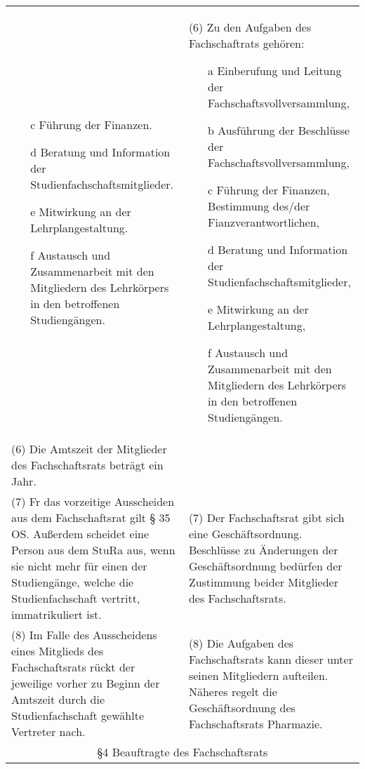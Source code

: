 {\begin{longtable}{|p{7.5cm}|p{7.5cm}|}
\begin{enumerate}
            \item[c] Führung der Finanzen.
            \item[d] Beratung und Information der Studienfachschaftsmitglieder.
            \item[e] Mitwirkung an der Lehrplangestaltung.
            \item[f] Austausch und Zusammenarbeit mit den Mitgliedern des Lehrkörpers in den betroffenen Studiengängen.
        \end{enumerate}&
        (6) Zu den Aufgaben des Fachschaftrats gehören:
        \begin{enumerate}
            \item[a] Einberufung und Leitung der Fachschaftsvollversammlung,
            \item[b] Ausführung der Beschlüsse der Fachschaftsvollversammlung,
            \item[c] Führung der Finanzen, Bestimmung des/der Fianzverantwortlichen,
            \item[d] Beratung und Information der Studienfachschaftsmitglieder,
            \item[e] Mitwirkung an der Lehrplangestaltung,
            \item[f] Austausch und Zusammenarbeit mit den Mitgliedern  des  Lehrkörpers  in  den  betroffenen Studiengängen. 
        \end{enumerate}\\
        (6) Die Amtszeit der Mitglieder des Fachschaftsrats beträgt ein Jahr.& \\
        (7) Fr das vorzeitige Ausscheiden aus dem Fachschaftsrat gilt § 35 OS. Außerdem scheidet eine Person
        aus dem StuRa aus, wenn sie nicht mehr für einen der Studiengänge, welche die Studienfachschaft
        vertritt, immatrikuliert ist.&
        (7) Der Fachschaftsrat gibt sich eine Geschäftsordnung. Beschlüsse zu Änderungen der Geschäftsordnung
        bedürfen der Zustimmung beider Mitglieder des Fachschaftsrats.\\
        (8) Im Falle des Ausscheidens eines Mitglieds des Fachschaftsrats rückt der jeweilige vorher zu Beginn
        der Amtszeit durch die Studienfachschaft gewählte Vertreter nach.&
        (8) Die  Aufgaben  des  Fachschaftsrats  kann  dieser unter seinen Mitgliedern aufteilen. Näheres regelt
        die Geschäftsordnung des Fachschaftsrats Pharmazie.\\\hline
        \multicolumn{2}{|c|}{§4 Beauftragte des Fachschaftsrats}\\\hline

\end{longtable}}
